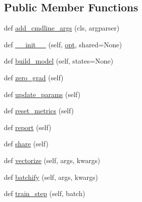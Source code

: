 \subsection*{Public Member Functions}
\begin{DoxyCompactItemize}
\item 
def \hyperlink{classcontrollable__seq2seq_1_1controllable__seq2seq_1_1ControllableSeq2seqAgent_aa1c9c9bd972290f2e0aacb2efcc5fd1e}{add\+\_\+cmdline\+\_\+args} (cls, argparser)
\item 
def \hyperlink{classcontrollable__seq2seq_1_1controllable__seq2seq_1_1ControllableSeq2seqAgent_a2cbe8ed3b2b6b82be90db6b45331800b}{\+\_\+\+\_\+init\+\_\+\+\_\+} (self, \hyperlink{classparlai_1_1core_1_1torch__agent_1_1TorchAgent_a785bb920cf8c8afc3e9bf6a8b77e335a}{opt}, shared=None)
\item 
def \hyperlink{classcontrollable__seq2seq_1_1controllable__seq2seq_1_1ControllableSeq2seqAgent_a7341b7dedc7150c4dfa27254188360c1}{build\+\_\+model} (self, states=None)
\item 
def \hyperlink{classcontrollable__seq2seq_1_1controllable__seq2seq_1_1ControllableSeq2seqAgent_aef0ce4355736782b861b06407d5de115}{zero\+\_\+grad} (self)
\item 
def \hyperlink{classcontrollable__seq2seq_1_1controllable__seq2seq_1_1ControllableSeq2seqAgent_a22b034e548a14336673b88c665bd2bcf}{update\+\_\+params} (self)
\item 
def \hyperlink{classcontrollable__seq2seq_1_1controllable__seq2seq_1_1ControllableSeq2seqAgent_aca4a0f3e0d8da6f75070febb92498e8c}{reset\+\_\+metrics} (self)
\item 
def \hyperlink{classcontrollable__seq2seq_1_1controllable__seq2seq_1_1ControllableSeq2seqAgent_a0e4d244d148a011ab541b204518e227a}{report} (self)
\item 
def \hyperlink{classcontrollable__seq2seq_1_1controllable__seq2seq_1_1ControllableSeq2seqAgent_a153984d9d4758330a17f59ff6df1ac7c}{share} (self)
\item 
def \hyperlink{classcontrollable__seq2seq_1_1controllable__seq2seq_1_1ControllableSeq2seqAgent_abc61b7cba7923306a813a8b2f71c3895}{vectorize} (self, args, kwargs)
\item 
def \hyperlink{classcontrollable__seq2seq_1_1controllable__seq2seq_1_1ControllableSeq2seqAgent_a5c1519c979bef4908400d72e4ea001fc}{batchify} (self, args, kwargs)
\item 
def \hyperlink{classcontrollable__seq2seq_1_1controllable__seq2seq_1_1ControllableSeq2seqAgent_a88e4d25c8f2eccaf1c7595d40c4f607b}{train\+\_\+step} (self, batch)

\end{DoxyCompactItemize}
